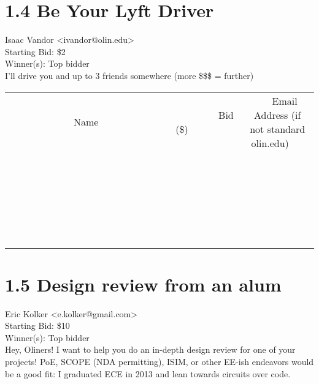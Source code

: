 \documentclass[11pt]{article}
\begin{document}
					\section*{1.4 Be Your Lyft Driver}
					Isaac Vandor <ivandor@olin.edu> \\
					Starting Bid: \$2 \\
					Winner(s): Top bidder \\
					I'll drive you and up to 3 friends somewhere (more \$\$\$ = further) \\
					[6ex]
					\begin{tabular}{c c c}
						~~~~~~~~~~~~~Name~~~~~~~~~~~~~ & ~~~~~~~~~Bid (\$)~~~~~~~~~ & ~~~Email Address (if not standard olin.edu)~~~ \\
				
 & & \\
\hline
 & & \\
\hline
 & & \\
\hline
 & & \\
\hline
 & & \\
\hline
 & & \\
\hline
 & & \\
\hline
 & & \\
\hline
 & & \\
\hline
 & & \\
\hline
 & & \\
\hline
 & & \\
\hline
 & & \\
\hline
 & & \\
\hline
 & & \\
\hline
 & & \\
\hline
 & & \\
\hline
 & & \\
\hline
 & & \\
\hline
 & & \\
\hline
 & & \\
\hline
 & & \\
\hline
 & & \\
\hline
 & & \\
\hline
 & & \\
\hline
 & & \\
\hline
					\end{tabular}
					\clearpage
				
					\section*{1.5 Design review from an alum}
					Eric Kolker <e.kolker@gmail.com> \\
					Starting Bid: \$10 \\
					Winner(s): Top bidder \\
					Hey, Oliners! I want to help you do an in-depth design review for one of your projects! PoE, SCOPE (NDA permitting), ISIM, or other EE-ish endeavors would be a good fit: I graduated ECE in 2013 and lean towards circuits over code.
\end{document}
